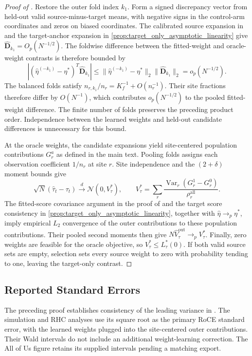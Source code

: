 \documentclass[12pt]{article}
\begin{document}
\begin{proof}[Proof of ]
Restore the outer fold index $k_1$. Form a signed discrepancy vector from held-out valid source-minus-target means, with negative signs in the control-arm coordinates and zeros on biased coordinates. The calibrated source expansion in  and the target-anchor expansion in \cref{prop:target_only_asymptotic_linearity} give $\widehat{\boldsymbol D}_{k_1}=O_p(N^{-1/2})$. The foldwise difference between the fitted-weight and oracle-weight contrasts is therefore bounded by
\[
| (\widehat\eta^{(-k_1)}-\eta^*)^T\widehat{\boldsymbol D}_{k_1} |
\le\|\widehat\eta^{(-k_1)}-\eta^*\|_2\|\widehat{\boldsymbol D}_{k_1}\|_2
=o_p(N^{-1/2}).
\]
The balanced folds satisfy $n_{r,k_1}/n_r=K_f^{-1}+O(n_r^{-1})$. Their site fractions therefore differ by $O(N^{-1})$, which contributes $o_p(N^{-1/2})$ to the pooled fitted-weight difference. The finite number of folds preserves the preceding product order. Independence between the learned weights and held-out candidate differences is unnecessary for this bound.

At the oracle weights, the candidate expansions yield site-centered population contributions $G_r^a$ as defined in the main text. Pooling folds assigns each observation coefficient $1/n_r$ at site $r$. Site independence and the $(2+\delta)$ moment bounds give
\[
\sqrt N(\widehat\tau_t-\tau_t)\xrightarrow{d}\mathcal N(0,V_\tau^*),
\qquad V_\tau^*=\sum_r\frac{\operatorname{Var}_r(G_r^1-G_r^0)}{\rho_r^{\mathrm{all}}}.
\]
The fitted-score covariance argument in the proof of  and the target score consistency in \cref{prop:target_only_asymptotic_linearity}, together with $\widehat\eta\to_p\eta^*$, imply empirical $L_2$ convergence of the outer contributions to these population contributions. Their pooled second moments then give $N\widehat V_\tau^{\mathrm{out}}\to_p V_\tau^*$. Finally, zero weights are feasible for the oracle objective, so $V_\tau^*\le L_\tau^*(0)$. If both valid source sets are empty, selection sets every source weight to zero with probability tending to one, leaving the target-only contrast.
\end{proof}

\subsection{Reported Standard Errors}\label{supp:reported_variance}
The preceding proof establishes consistency of the leading variance in . The simulation and RHC analyses use its square root as the primary RoCE standard error, with the learned weights plugged into the site-centered outer contributions. Their Wald intervals do not include an additional weight-learning correction. The All of Us figure retains its supplied intervals pending a matching export.\par
\end{document}
